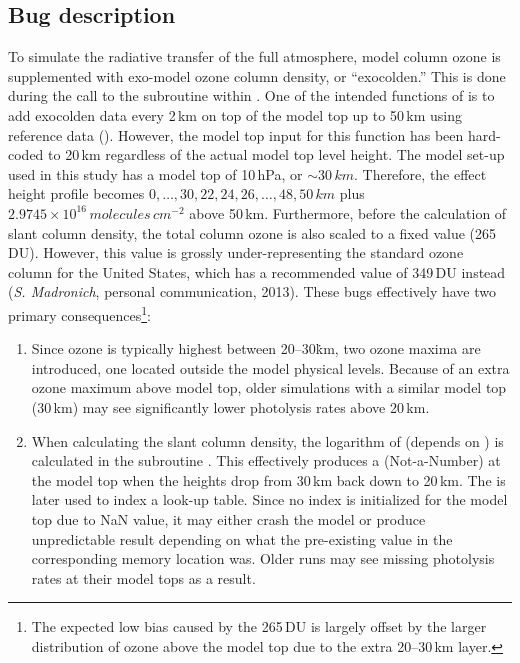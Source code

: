 \subsection{Bug description}\label{a-ssec:bug/ftuv/bug}
To simulate the radiative transfer of the full atmosphere, model column ozone is supplemented with exo-model ozone column density, or ``exocolden.'' This is done during the call to the subroutine  within . One of the intended functions of  is to add exocolden data every 2\,\unit{km} on top of the model top up to 50\,\unit{km} using reference data (). However, the model top input for this function has been hard-coded to 20\,\unit{km} regardless of the actual model top level height. The model set-up used in this study has a model top of 10\,\unit{hPa}, or $\sim30\,\unit{km}$. Therefore, the effect height profile becomes $0,\ldots,30,22,24,26,\ldots,48,50\,\unit{km}$ plus $2.9745\times10^{16}\,\unit{molecules\,cm^{-2}}$ above 50\,\unit{km}. Furthermore, before the calculation of slant column density, the total column ozone is also scaled to a fixed value (265\,\unit{DU}). However, this value is grossly under-representing the standard ozone column for the United States, which has a recommended value of 349\,\unit{DU} instead (\textit{S. Madronich}, personal communication, 2013). These bugs effectively have two primary consequences\footnote{The expected low bias caused by the 265\,\unit{DU} is largely offset by the larger distribution of ozone above the model top due to the extra 20--30\,\unit{km} layer.}:
\begin{enumerate}
	\item Since ozone is typically highest between 20--30\.\unit{km}, two ozone maxima are introduced, one located outside the model physical levels. Because of an extra ozone maximum above model top, older simulations with a similar model top (30\,\unit{km}) may see significantly lower photolysis rates above 20\,\unit{km}.
	\item When calculating the slant column density, the logarithm of  (depends on ) is calculated in the subroutine . This effectively produces a  (Not-a-Number) at the model top when the heights drop from 30\,\unit{km} back down to 20\,\unit{km}. The is later used to index a look-up table. Since no index is initialized for the model top due to NaN value, it may either crash the model or produce unpredictable result depending on what the pre-existing value in the corresponding memory location was. Older runs may see missing photolysis rates at their model tops as a result.
\end{enumerate}

